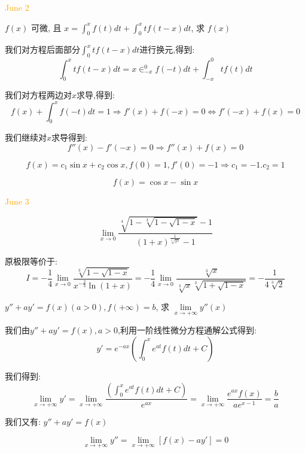 \textcolor{orange}{June 2}

\begin{example}[][Exam: 32.1.3]
	$f(x)$ 可微, 且 $x=\int_{0}^{x}f(t)dt+\int_{0}^{x}tf(t-x)dt$, 求 $f(x)$
\end{example}

\begin{solution}
	
	我们对方程后面部分$\int_{0}^{x}tf(t-x)dt$进行换元,得到: 
	$$\int_{0}^{x}tf(t-x)dt=x\in_{-x}^{0}f(-t)dt+\int_{-x}^{0}tf(t)dt$$
	
	我们对方程两边对$x$求导,得到: 
	$$f(x)+\int_{0}^{x}f(-t)dt=1\Rightarrow f'(x)+f(-x)=0\Leftrightarrow f'(-x)+f(x)=0$$
	
	我们继续对$x$求导得到: 
	$$f''(x)-f'(-x)=0\Rightarrow f''(x)+f(x)=0$$
	
	$$f(x)=c_{1}\sin x+c_{2}\cos x,f(0)=1,f'(0)=-1\Rightarrow c_{1}=-1.c_{2}=1$$
	
	$$f(x)=\cos x-\sin x$$
\end{solution}


\textcolor{orange}{June 3}

\begin{example}[][Exam: 32.1.4]
	$$\lim\limits_{x\to 0}\dfrac{\sqrt[4]{1-\sqrt[3]{1-\sqrt{1-x}}}-1}{(1+x)^{\frac{1}{\sqrt[3]{x^2}}}-1}$$
\end{example}

\begin{solution}
	
	原极限等价于: 
	$$I=-\frac{1}{4}\lim\limits_{x\to 0}\dfrac{\sqrt[3]{1-\sqrt{1-x}}}{x^{-\frac{2}{3}}\ln(1+x)}=-\frac{1}{4}\lim\limits_{x\to 0}\dfrac{\sqrt[3]{x}}{\sqrt[3]{x}\sqrt[3]{1+\sqrt{1-x}}}=-\frac{1}{4\sqrt[3]{2}}$$
\end{solution}

\begin{example}[][Exam: 32.1.5]
	$y''+ay'=f(x)(a>0), f(+\infty)=b$, 求 $\lim\limits_{x\to +\infty}y''(x)$
\end{example}
 
\begin{solution}
	
	我们由$y''+ay'=f(x),a>0$,利用一阶线性微分方程通解公式得到: 
	$$y'=e^{-ax}\left(\int_{0}^{x}e^{at}f(t)dt+C \right) $$
	
	我们得到: 
	$$\lim\limits_{x\to +\infty}y'=\lim\limits_{x\to +\infty}\dfrac{\left(\int_{0}^{x}e^{at}f(t)dt+C \right)}{e^{ax}}=\lim\limits_{x\to +\infty}\dfrac{e^{ax}f(x)}{ae^{x-1}}=\dfrac{b}{a}$$
	
	我们又有: $y''+ay'=f(x)$
	
	$$\lim\limits_{x\to +\infty}y''=\lim\limits_{x\to +\infty}[f(x)-ay']=0$$
\end{solution}


